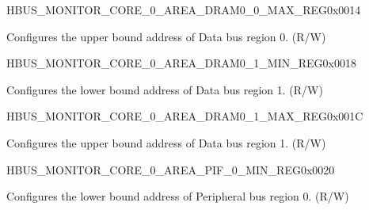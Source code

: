 \begin{register}{H}{BUS\_MONITOR\_CORE\_0\_AREA\_DRAM0\_0\_MAX\_REG}{0x0014}\label{regdesc:BUSMONITORCORE0AREADRAM00MAXREG}
%
\regnewline%
\begin{regdesc}\begin{reglist}
\label{fielddesc:BUSMONITORCORE0AREADRAM00MAX}\item [BUS\_MONITOR\_CORE\_0\_AREA\_DRAM0\_0\_MAX] Configures the upper bound address of Data bus region 0. (R/W)
\end{reglist}\end{regdesc}
\end{register}


\begin{register}{H}{BUS\_MONITOR\_CORE\_0\_AREA\_DRAM0\_1\_MIN\_REG}{0x0018}\label{regdesc:BUSMONITORCORE0AREADRAM01MINREG}
%
\regnewline%
\begin{regdesc}\begin{reglist}
\label{fielddesc:BUSMONITORCORE0AREADRAM01MIN}\item [BUS\_MONITOR\_CORE\_0\_AREA\_DRAM0\_1\_MIN] Configures the lower bound address of Data bus region 1. (R/W)
\end{reglist}\end{regdesc}
\end{register}


\begin{register}{H}{BUS\_MONITOR\_CORE\_0\_AREA\_DRAM0\_1\_MAX\_REG}{0x001C}\label{regdesc:BUSMONITORCORE0AREADRAM01MAXREG}
%
\regnewline%
\begin{regdesc}\begin{reglist}
\label{fielddesc:BUSMONITORCORE0AREADRAM01MAX}\item [BUS\_MONITOR\_CORE\_0\_AREA\_DRAM0\_1\_MAX] Configures the upper bound address of Data bus region 1. (R/W)
\end{reglist}\end{regdesc}
\end{register}


\begin{register}{H}{BUS\_MONITOR\_CORE\_0\_AREA\_PIF\_0\_MIN\_REG}{0x0020}\label{regdesc:BUSMONITORCORE0AREAPIF0MINREG}
%
\regnewline%
\begin{regdesc}\begin{reglist}
\label{fielddesc:BUSMONITORCORE0AREAPIF0MIN}\item [BUS\_MONITOR\_CORE\_0\_AREA\_PIF\_0\_MIN] Configures the lower bound address of Peripheral bus region 0. (R/W)
\end{reglist}\end{regdesc}
\end{register}



